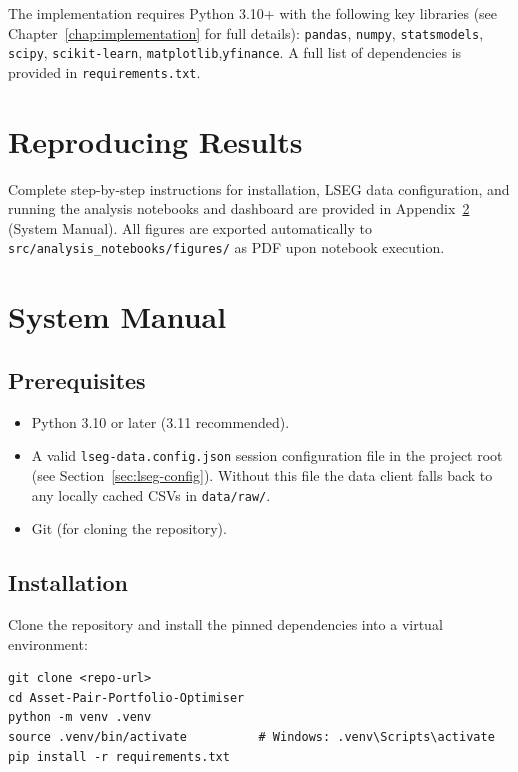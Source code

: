 \documentclass[a4paper]{report}
\begin{document}
The implementation requires Python 3.10+ with the following key libraries 
(see Chapter~\ref{chap:implementation} for full details): 
\texttt{pandas}, \texttt{numpy}, \texttt{statsmodels}, \texttt{scipy}, 
\texttt{scikit-learn}, \texttt{matplotlib},\texttt{yfinance}.
A full list of dependencies is provided in \texttt{requirements.txt}.

\section{Reproducing Results}
Complete step-by-step instructions for installation, LSEG data configuration, and running the analysis notebooks and dashboard are provided in Appendix~\ref{appendix:system-manual} (System Manual).
All figures are exported automatically to \texttt{src/analysis\_notebooks/figures/} as PDF upon notebook execution.

\section{System Manual}%
\label{appendix:system-manual}

\subsection{Prerequisites}

\begin{itemize}
    \item Python 3.10 or later (3.11 recommended).
    \item A valid \texttt{lseg-data.config.json} session configuration file in the project root (see Section~\ref{sec:lseg-config}).  Without this file the data client falls back to any locally cached CSVs in \texttt{data/raw/}.
    \item Git (for cloning the repository).
\end{itemize}

\subsection{Installation}

Clone the repository and install the pinned dependencies into a virtual environment:

\begin{Verbatim}[fontsize=\small, baselinestretch=0.9]
git clone <repo-url>
cd Asset-Pair-Portfolio-Optimiser
python -m venv .venv
source .venv/bin/activate          # Windows: .venv\Scripts\activate
pip install -r requirements.txt
\end{Verbatim}
\end{document}
